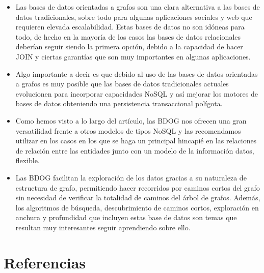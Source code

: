 \documentclass[preprint,12pt]{elsarticle}
\begin{document}
\begin{itemize}

\item  Las bases de datos orientadas a grafos son una clara alternativa a las bases de datos tradicionales, sobre todo para algunas aplicaciones sociales y web que requieren elevada escalabilidad. Estas bases de datos no son idóneas para todo, de hecho en la mayoría de los casos las bases de datos relacionales deberían seguir siendo la primera opción, debido a la capacidad de hacer JOIN y ciertas garantías que son muy importantes en algunas aplicaciones. \\ 

\item Algo importante a decir es que debido al uso de las bases de datos orientadas a grafos es muy posible que las bases de datos tradicionales actuales evolucionen para incorporar capacidades NoSQL y así mejorar los motores de bases de datos obteniendo una persistencia transaccional polígota. \\ 

\item Como hemos visto a lo largo del artículo, las BDOG nos ofrecen una gran versatilidad frente a otros modelos de tipos NoSQL y las recomendamos utilizar en los casos en los que se haga un principal hincapié en las relaciones de relación entre las entidades junto con un modelo de la información datos, flexible. \\

\item Las BDOG facilitan la exploración de los datos gracias a su naturaleza de estructura de grafo, permitiendo hacer recorridos por caminos cortos del grafo sin necesidad de verificar la totalidad de caminos del árbol de grafos. Además, los algoritmos de búsqueda, descubrimiento de caminos cortos, exploración en anchura y profundidad que incluyen estas base de datos son temas que resultan muy interesantes seguir aprendiendo sobre ello.\\ 


\end{itemize}

\newpage

	
\section{Referencias}
\end{document}
